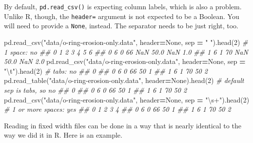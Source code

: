 \documentclass[
  12pt,
  krantz2]{krantz}
\makeatletter
\newenvironment{Shaded}{\begin{snugshade}}{\end{snugshade}}
\newcommand{\CharTok}[1]{\textcolor[rgb]{0.5,0.5,0.5}{#1}}
\newcommand{\CommentTok}[1]{\textcolor[rgb]{0.37,0.37,0.37}{\textit{#1}}}
\newcommand{\DecValTok}[1]{\textcolor[rgb]{0.06,0.06,0.06}{#1}}
\newcommand{\NormalTok}[1]{#1}
\newcommand{\OperatorTok}[1]{\textcolor[rgb]{0.43,0.43,0.43}{\textbf{#1}}}
\newcommand{\StringTok}[1]{\textcolor[rgb]{0.5,0.5,0.5}{#1}}
\newcommand{\VariableTok}[1]{\textcolor[rgb]{0,0,0}{#1}}
\newenvironment{kframe}{%
\medskip{}
\setlength{\fboxsep}{.8em}
 \def\at@end@of@kframe{}%
 \ifinner\ifhmode%
  \def\at@end@of@kframe{\end{minipage}}%
  \begin{minipage}{\columnwidth}%
 \fi\fi%
 \def\FrameCommand##1{\hskip\@totalleftmargin \hskip-\fboxsep
 \colorbox{shadecolor}{##1}\hskip-\fboxsep
     \hskip-\linewidth \hskip-\@totalleftmargin \hskip\columnwidth}%
 \MakeFramed {\advance\hsize-\width
   \@totalleftmargin\z@ \linewidth\hsize
   \@setminipage}}%
 {\par\unskip\endMakeFramed%
 \at@end@of@kframe}
\renewenvironment{Shaded}{\begin{kframe}}{\end{kframe}}
\makeatother
\begin{document}
By default, \texttt{pd.read\_csv()} is expecting column labels, which is also a problem. Unlike R, though, the \texttt{header=} argument is not expected to be a Boolean. You will need to provide a \texttt{None}, instead. The separator needs to be just right, too.

\begin{Shaded}
\begin{Highlighting}[]
\NormalTok{pd.read\_csv(}\StringTok{"data/o{-}ring{-}erosion{-}only.data"}\NormalTok{, }
\NormalTok{            header}\OperatorTok{=}\VariableTok{None}\NormalTok{, sep }\OperatorTok{=} \StringTok{" "}\NormalTok{).head(}\DecValTok{2}\NormalTok{) }\CommentTok{\# 1 space: no}
\CommentTok{\#\#    0  1   2   3     4   5    6}
\CommentTok{\#\# 0  6  0  66 NaN  50.0 NaN  1.0}
\CommentTok{\#\# 1  6  1  70 NaN  50.0 NaN  2.0}
\NormalTok{pd.read\_csv(}\StringTok{"data/o{-}ring{-}erosion{-}only.data"}\NormalTok{, }
\NormalTok{            header}\OperatorTok{=}\VariableTok{None}\NormalTok{, sep }\OperatorTok{=} \StringTok{"}\CharTok{\textbackslash{}t}\StringTok{"}\NormalTok{).head(}\DecValTok{2}\NormalTok{) }\CommentTok{\# tabs: no}
\CommentTok{\#\#                0}
\CommentTok{\#\# 0  6 0 66  50  1}
\CommentTok{\#\# 1  6 1 70  50  2}
\NormalTok{pd.read\_table(}\StringTok{"data/o{-}ring{-}erosion{-}only.data"}\NormalTok{, }
\NormalTok{              header}\OperatorTok{=}\VariableTok{None}\NormalTok{).head(}\DecValTok{2}\NormalTok{) }\CommentTok{\# default sep is tabs, so no}
\CommentTok{\#\#                0}
\CommentTok{\#\# 0  6 0 66  50  1}
\CommentTok{\#\# 1  6 1 70  50  2}
\NormalTok{pd.read\_csv(}\StringTok{"data/o{-}ring{-}erosion{-}only.data"}\NormalTok{, }
\NormalTok{            header}\OperatorTok{=}\VariableTok{None}\NormalTok{, sep }\OperatorTok{=} \StringTok{"\textbackslash{}s+"}\NormalTok{).head(}\DecValTok{2}\NormalTok{) }\CommentTok{\# 1 or more spaces: yes}
\CommentTok{\#\#    0  1   2   3  4}
\CommentTok{\#\# 0  6  0  66  50  1}
\CommentTok{\#\# 1  6  1  70  50  2}
\end{Highlighting}
\end{Shaded}

Reading in fixed width files can be done in a way that is nearly identical to the way we did it in R. Here is an example.
\end{document}
